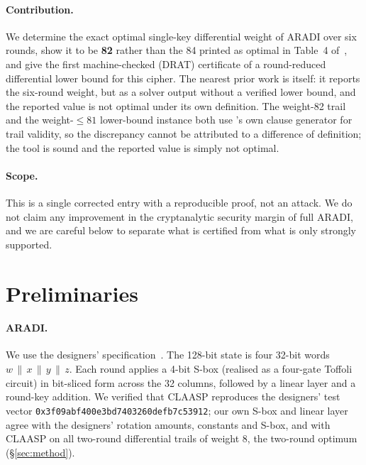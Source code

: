 \documentclass[11pt]{article}
\newcommand{\hex}[1]{\texttt{#1}}
\begin{document}
\paragraph{Contribution.} We determine the exact optimal single-key differential weight of ARADI over six rounds, show it to be \textbf{82} rather than the 84 printed as optimal in Table~4 of~\cite{claasping}, and give the first machine-checked (DRAT) certificate of a round-reduced differential lower bound for this cipher. The nearest prior work is \cite{claasping} itself: it reports the six-round weight, but as a solver output without a verified lower bound, and the reported value is not optimal under its own definition. The weight-82 trail and the weight-$\le 81$ lower-bound instance both use \cite{claasping}'s own clause generator for trail validity, so the discrepancy cannot be attributed to a difference of definition; the tool is sound and the reported value is simply not optimal.

\paragraph{Scope.} This is a single corrected entry with a reproducible proof, not an attack. We do not claim any improvement in the cryptanalytic security margin of full ARADI, and we are careful below to separate what is certified from what is only strongly supported.

\section{Preliminaries}

\paragraph{ARADI.} We use the designers' specification~\cite{aradi}. The 128-bit state is four 32-bit words $w\,\|\,x\,\|\,y\,\|\,z$. Each round applies a 4-bit S-box (realised as a four-gate Toffoli circuit) in bit-sliced form across the 32 columns, followed by a linear layer and a round-key addition. We verified that CLAASP reproduces the designers' test vector \hex{0x3f09abf400e3bd7403260defb7c53912}; our own S-box and linear layer agree with the designers' rotation amounts, constants and S-box, and with CLAASP on all two-round differential trails of weight 8, the two-round optimum (\S\ref{sec:method}).
\end{document}
